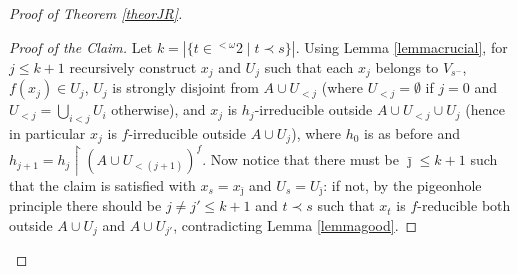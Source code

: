 \documentclass{rae}
\def\Cl{{\rm Cl}}
\newcommand{\conc}{{}^\smallfrown}
\newcommand{\restr}[2]{#1 \restriction #2}
\theoremstyle{definition}
\begin{document}
\begin{proof}[Proof of Theorem \ref{theorJR}]
\begin{proof}[Proof of the Claim]
Let $k = |\{ t \in {}^{<\omega}2 \mid t \prec s \}  |$. Using Lemma \ref{lemmacrucial}, for $j \leq k+1$ recursively construct $x_j$ and $U_j$  such that each $x_j$ belongs to $V_{s^-}$, $f(x_j) \in U_j$, $U_j$ is strongly disjoint from $A \cup U_{<j}$ (where $U_{<j} = \emptyset$ if $j=0$ and $U_{<j} = \bigcup_{i<j}U_i$ otherwise), and $x_j$ is $h_j$-irreducible outside $A \cup U_{<j} \cup U_j$ (hence in particular $x_j$ is  $f$-irreducible outside $A \cup U_j$), where $h_0$ is as before and $h_{j+1} =\restr{ h_j}{(A \cup U_{<(j+1)})^f}$. Now notice that there must be $\bar{\jmath} \leq k+1$ such that the claim is satisfied with $x_s = x_{\bar{\jmath}}$ and $U_s = U_{\bar{\jmath}}$: if not, by the pigeonhole principle there should be $j \neq j' \leq k+1$ and $t \prec s$ such that $x_t$ is $f$-reducible both outside $A \cup U_j$ and $A \cup U_{j'}$, contradicting Lemma \ref{lemmagood}.
%
%
%
%

\end{proof}
\end{proof}
\end{document}
